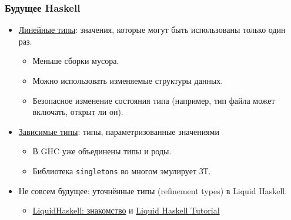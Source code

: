\documentclass[11pt]{beamer}
\begin{document}
\begin{frame}[fragile]
\frametitle{Будущее Haskell}
\begin{itemize}
    \item \href{https://www.tweag.io/posts/2017-03-13-linear-types.html}{Линейные типы}: значения, которые могут быть использованы только один раз.
    \begin{itemize}
        \item Меньше сборки мусора.
        \item Можно использовать изменяемые структуры данных.
        \item Безопасное изменение состояния типа (например, тип файла может включать, открыт ли он).
    \end{itemize}
    \pause
    \item \href{https://serokell.io/blog/2018/12/17/why-dependent-haskell}{Зависимые типы}: типы, параметризованные значениями
        \begin{itemize}
            \item В GHC уже объединены типы и роды.
            \item Библиотека \lstinline|singletons| во многом эмулирует ЗТ.
        \end{itemize}
    \pause
    \item Не совсем будущее: уточнённые типы (refinement types) в Liquid Haskell.
        \begin{itemize}
            \item \href{https://ruhaskell.org/posts/utils/2016/12/16/liquidhaskell-hello.html}{LiquidHaskell: знакомство} и \href{https://liquid.kosmikus.org/}{Liquid Haskell Tutorial}
        \end{itemize}
\end{itemize}
\end{frame}
\end{document}

